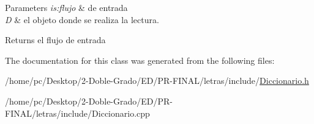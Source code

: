 \begin{DoxyParams}{Parameters}
{\em is\-:flujo} & de entrada \\
\hline
{\em D} & el objeto donde se realiza la lectura. \\
\hline
\end{DoxyParams}
\begin{DoxyReturn}{Returns}
el flujo de entrada 
\end{DoxyReturn}


The documentation for this class was generated from the following files\-:\begin{DoxyCompactItemize}
\item 
/home/pc/\-Desktop/2-\/\-Doble-\/\-Grado/\-E\-D/\-P\-R-\/\-F\-I\-N\-A\-L/letras/include/\hyperlink{Diccionario_8h}{Diccionario.\-h}\item 
/home/pc/\-Desktop/2-\/\-Doble-\/\-Grado/\-E\-D/\-P\-R-\/\-F\-I\-N\-A\-L/letras/include/Diccionario.\-cpp\end{DoxyCompactItemize}
